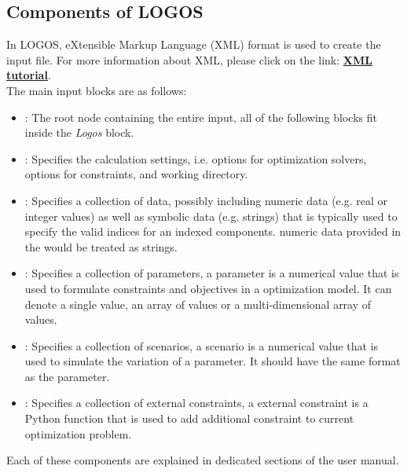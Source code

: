 \subsection{Components of LOGOS}
In LOGOS, eXtensible Markup Language (XML) format is used to create the input file. For more
information about XML, please click on the link:
\href{https://www.w3schools.com/xml/default.asp}{\textbf{XML tutorial}}.
%
\\The main input blocks are as follows:
\begin{itemize}
  \item {}: The root node containing the
  entire input, all of
  the following blocks fit inside the \emph{Logos} block.
  \item {}: Specifies the calculation settings, i.e. options for
	optimization solvers, options for constraints, and working directory.
  \item {}: Specifies a collection of data, possibly including
	numeric data (e.g. real or integer values) as well as symbolic data (e.g. strings)
	that is typically used to specify the valid indices for an indexed components.
	\nb numeric data provided in the  would be treated as strings.
	\item {}: Specifies a collection of parameters, a parameter
	is a numerical value that is used to formulate constraints and objectives in a
	optimization model. It can denote a single value, an array of values or a multi-dimensional
	array of values.
	\item {}: Specifies a collection of scenarios, a scenario is a
	numerical value that is used to simulate the variation of a parameter. It should have
	the same format as the parameter.
	\item {}: Specifies a collection of external constraints, a
	external constraint is a Python function that is used to add additional constraint to
	current optimization problem.
\end{itemize}

Each of these components are explained in dedicated sections of the user manual.

